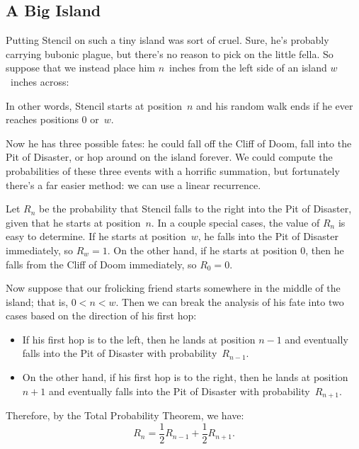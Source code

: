 \subsection{A Big Island}\label{sec:flea_analysis}

Putting Stencil on such a tiny island was sort of cruel.  Sure, he's
probably carrying bubonic plague, but there's no reason to pick on the
little fella.  So suppose that we instead place him $n$~inches from
the left side of an island $w$~inches across:
%
\begin{figure}[h]

\end{figure}
%
In other words, Stencil starts at position~$n$ and his random walk
ends if he ever reaches positions 0 or~$w$.

Now he has three possible fates: he could fall off the Cliff of Doom,
fall into the Pit of Disaster, or hop around on the island forever.
We could compute the probabilities of these three events with a
horrific summation, but fortunately there's a far easier method: we
can use a linear recurrence.

Let $R_n$ be the probability that Stencil falls to the right into the
Pit of Disaster, given that he starts at position~$n$.  In a couple
special cases, the value of $R_n$ is easy to determine.  If he starts
at position~$w$, he falls into the Pit of Disaster immediately, so
$R_w = 1$.  On the other hand, if he starts at position $0$, then he
falls from the Cliff of Doom immediately, so $R_0 = 0$.

Now suppose that our frolicking friend starts somewhere in the middle
of the island; that is, $0 < n < w$.  Then we can break the analysis
of his fate into two cases based on the direction of his first hop:
%
\begin{itemize}

\item

If his first hop is to the left, then he lands at position $n-1$ and
eventually falls into the Pit of Disaster with probability~$R_{n-1}$.

\item

On the other hand, if his first hop is to the right, then he lands at
position~$n+1$ and eventually falls into the Pit of Disaster with
probability~$R_{n+1}$.

\end{itemize}
%
Therefore, by the Total Probability Theorem, we have:
%
\[
R_n = \frac{1}{2} R_{n-1} + \frac{1}{2} R_{n+1}.
\]

